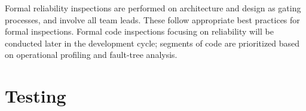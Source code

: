 \documentclass[11pt]{wacomepd}
\begin{document}
Formal reliability inspections are performed on architecture and design as gating processes, and
involve all team leads.  These follow appropriate best practices for formal inspections.  Formal
code inspections focusing on reliability will be conducted later in the development cycle; segments
of code are prioritized based on operational profiling and fault-tree analysis.


\chapter{Testing}
\end{document}
